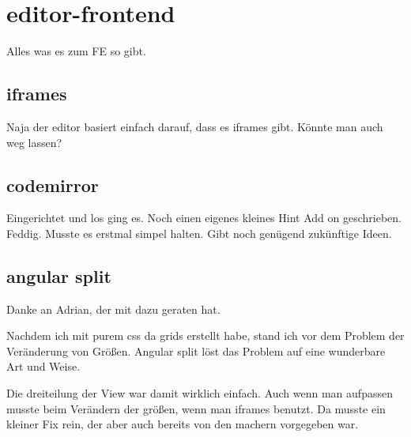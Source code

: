 \section{editor-frontend}\label{sec:editor-frontend}
Alles was es zum FE so gibt.

\subsection{iframes}\label{subsec:iframes}
Naja der editor basiert einfach darauf, dass es iframes gibt.
Könnte man auch weg lassen?

\subsection{codemirror}\label{subsec:codemirror}
Eingerichtet und los ging es.
Noch einen eigenes kleines Hint Add on geschrieben.
Feddig.
Musste es erstmal simpel halten.
Gibt noch genügend zukünftige Ideen.

\subsection{angular split}\label{subsec:angular-split}
Danke an Adrian, der mit dazu geraten hat.

Nachdem ich mit purem css da grids erstellt habe, stand ich vor dem Problem der Veränderung von Größen.
Angular split löst das Problem auf eine wunderbare Art und Weise.

Die dreiteilung der View war damit wirklich einfach.
Auch wenn man aufpassen musste beim Verändern der größen, wenn man iframes benutzt.
Da musste ein kleiner Fix rein, der aber auch bereits von den machern vorgegeben war.

